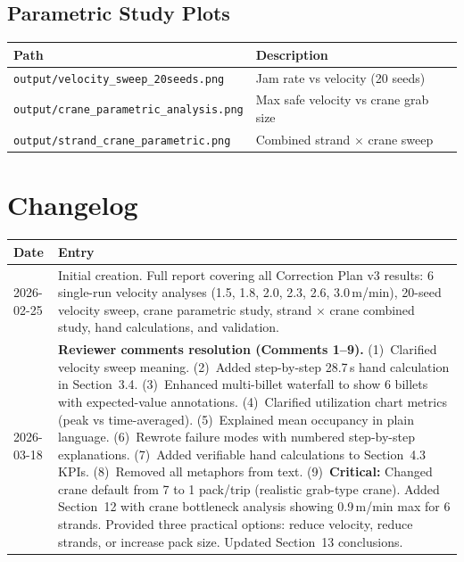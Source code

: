 \documentclass[11pt,a4paper]{article}
\begin{document}
\subsection{Parametric Study Plots}

\begin{table}[H]
\centering
\begin{tabular}{@{}lp{8cm}@{}}
\toprule
Path & Description \\
\midrule
\texttt{output/velocity\_sweep\_20seeds.png} & Jam rate vs velocity (20 seeds) \\
\texttt{output/crane\_parametric\_analysis.png} & Max safe velocity vs crane grab size \\
\texttt{output/strand\_crane\_parametric.png} & Combined strand $\times$ crane sweep \\
\bottomrule
\end{tabular}
\end{table}

\section{Changelog}
\label{app:changelog}

\begin{table}[H]
\centering
\begin{tabular}{@{}lp{12cm}@{}}
\toprule
Date & Entry \\
\midrule
2026-02-25 & Initial creation. Full report covering all Correction Plan v3 results: 6 single-run velocity analyses (1.5, 1.8, 2.0, 2.3, 2.6, 3.0\,m/min), 20-seed velocity sweep, crane parametric study, strand $\times$ crane combined study, hand calculations, and validation. \\
\midrule
2026-03-18 & \textbf{Reviewer comments resolution (Comments 1--9).} (1)~Clarified velocity sweep meaning. (2)~Added step-by-step 28.7\,s hand calculation in Section~3.4. (3)~Enhanced multi-billet waterfall to show 6 billets with expected-value annotations. (4)~Clarified utilization chart metrics (peak vs time-averaged). (5)~Explained mean occupancy in plain language. (6)~Rewrote failure modes with numbered step-by-step explanations. (7)~Added verifiable hand calculations to Section~4.3 KPIs. (8)~Removed all metaphors from text. (9)~\textbf{Critical:} Changed crane default from 7 to 1 pack/trip (realistic grab-type crane). Added Section~12 with crane bottleneck analysis showing 0.9\,m/min max for 6 strands. Provided three practical options: reduce velocity, reduce strands, or increase pack size. Updated Section~13 conclusions. \\
\bottomrule
\end{tabular}
\end{table}
\end{document}
